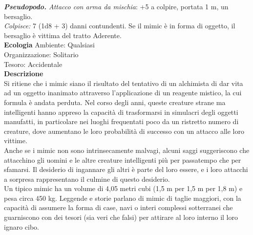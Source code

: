 \begin{multicols}{2}
\emph{\textbf{Pseudopodo.} Attacco con arma da mischia}: +5 a colpire, portata 1 m, un bersaglio.\\
\emph{Colpisce:} 7 (1d8 + 3) danni contundenti. Se il mimic è in forma di oggetto, il bersaglio è vittima del tratto Aderente.\\
\textbf{Ecologia}
Ambiente: Qualsiasi\\
Organizzazione: Solitario\\
Tesoro: Accidentale\\
\textbf{Descrizione}\\
Si ritiene che i mimic siano il risultato del tentativo di un alchimista di dar vita ad un oggetto inanimato attraverso l’applicazione di un reagente mistico, la cui formula è andata perduta. Nel corso degli anni, queste creature strane ma intelligenti hanno appreso la capacità di trasformarsi in simulacri degli oggetti manufatti, in particolare nei luoghi frequentati poco da un ristretto numero di creature, dove aumentano le loro probabilità di successo con un attacco alle loro vittime.\\
Anche se i mimic non sono intrinsecamente malvagi, alcuni saggi suggeriscono che attacchino gli uomini e le altre creature intelligenti più per passatempo che per sfamarsi. Il desiderio di ingannare gli altri è parte del loro essere, e i loro attacchi a sorpresa rappresentano il culmine di questo desiderio.\\
Un tipico mimic ha un volume di 4,05 metri cubi (1,5 m per 1,5 m per 1,8 m) e pesa circa 450 kg. Leggende e storie parlano di mimic di taglie maggiori, con la capacità di assumere la forma di case, navi o interi complessi sotterranei che guarniscono con dei tesori (sia veri che falsi) per attirare al loro interno il loro ignaro cibo.\\


\end{multicols}
